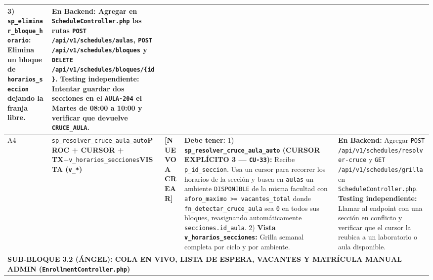 \documentclass[10pt,a4paper,landscape]{article}
\newcommand{\stNuevo}{\textbf{\textcolor{red!75!black}{[NUEVO A CREAR]}}}
\newcommand{\objView}{\textbf{\textcolor{violet!85!black}{VISTA (\texttt{v\_*})}}}
\newcommand{\objCursor}{\textbf{\textcolor{red!75!black}{PROC + CURSOR + TX}}}
\begin{document}
\begin{longtable}{|p{0.5cm}|p{3.8cm}|p{2.9cm}|p{8.8cm}|p{9.2cm}|}
3) \texttt{sp\_eliminar\_bloque\_horario}: Elimina un bloque de \texttt{horarios\_seccion} dejando la franja libre. & 
\textbf{En Backend:} Agregar en \texttt{ScheduleController.php} las rutas \texttt{POST /api/v1/schedules/aulas}, \texttt{POST /api/v1/schedules/bloques} y \texttt{DELETE /api/v1/schedules/bloques/\{id\}}.\newline
\textbf{Testing independiente:} Intentar guardar dos secciones en el \texttt{AULA-204} el Martes de 08:00 a 10:00 y verificar que devuelve \texttt{CRUCE\_AULA}. \\
\hline
\rowcolor{rowAlt}
A4 & \texttt{sp\_resolver\_cruce\_aula\_auto}\newline \objCursor\newline +\newline \texttt{v\_horarios\_secciones}\newline \objView & \stNuevo & 
\textbf{Debe tener:}
1) \textbf{\texttt{sp\_resolver\_cruce\_aula\_auto} (CURSOR EXPLÍCITO 3 — \texttt{CU-33}):} Recibe \texttt{p\_id\_seccion}. Usa un cursor para recorrer los horarios de la sección y busca en \texttt{aulas} un ambiente \texttt{DISPONIBLE} de la misma facultad con \texttt{aforo\_maximo >= vacantes\_total} donde \texttt{fn\_detectar\_cruce\_aula} sea \texttt{0} en todos sus bloques, reasignando automáticamente \texttt{secciones.id\_aula}.
2) \textbf{Vista \texttt{v\_horarios\_secciones}:} Grilla semanal completa por ciclo y por ambiente. & 
\textbf{En Backend:} Agregar \texttt{POST /api/v1/schedules/resolver-cruce} y \texttt{GET /api/v1/schedules/grilla} en \texttt{ScheduleController.php}.\newline
\textbf{Testing independiente:} Llamar al endpoint con una sección en conflicto y verificar que el cursor la reubica a un laboratorio o aula disponible. \\
\hline

\multicolumn{5}{|l|}{\cellcolor{angelHeader}\textbf{\textcolor{unjbgNavy}{SUB-BLOQUE 3.2 (ÁNGEL): COLA EN VIVO, LISTA DE ESPERA, VACANTES Y MATRÍCULA MANUAL ADMIN (\texttt{EnrollmentController.php})}}} \\
\hline


\end{longtable}
\end{document}
